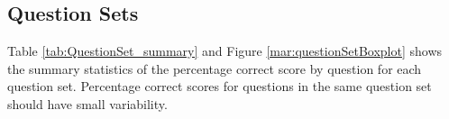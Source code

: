 \documentclass[12pt,english,nohyper]{tufte-handout}\usepackage[]{graphicx}\usepackage[]{color}
\begin{document}
\clearpage
\newpage{}
\subsection{Question Sets}

Table \ref{tab:QuestionSet_summary} and Figure \ref{mar:questionSetBoxplot} shows the summary statistics of the percentage correct score by question for each question set. Percentage correct scores for questions in the same question set should have small variability.


\end{document}
